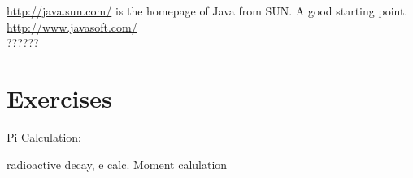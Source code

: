 \href{http://java.sun.com/}{http://java.sun.com/} is the homepage of
Java from SUN. A good starting point. \\

\href{http://www.javasoft.com/}{http://www.javasoft.com/} \\

??????


\section{Exercises}
Pi Calculation:



radioactive decay, e calc.
Moment calulation


\nocite{FLANAGAN-EXAMPLES}
\nocite{GOSLING}







